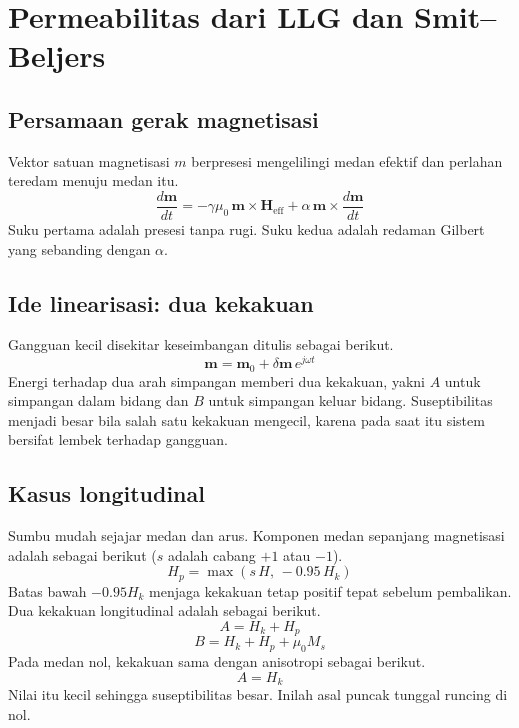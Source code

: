 \documentclass[a4paper,11pt]{article}
\begin{document}
\section{Permeabilitas dari LLG dan Smit--Beljers}
\subsection{Persamaan gerak magnetisasi}
Vektor satuan magnetisasi $m$ berpresesi mengelilingi medan efektif
dan perlahan teredam menuju medan itu.
\begin{equation}
\frac{d\mathbf{m}}{dt}
= -\gamma\mu_{0}\,\mathbf{m}\times\mathbf{H}_{\mathrm{eff}}
+ \alpha\,\mathbf{m}\times\frac{d\mathbf{m}}{dt}
\label{eq:8}
\end{equation}
Suku pertama adalah presesi tanpa rugi.
Suku kedua adalah redaman Gilbert yang sebanding dengan $\alpha$.

\subsection{Ide linearisasi: dua kekakuan}
Gangguan kecil disekitar keseimbangan ditulis sebagai berikut.
\begin{equation*}
\mathbf{m} = \mathbf{m}_{0}+\delta\mathbf{m}\,e^{j\omega t}
\end{equation*}
Energi terhadap dua arah simpangan memberi dua kekakuan, yakni $A$ untuk
simpangan dalam bidang dan $B$ untuk simpangan keluar bidang.
Suseptibilitas menjadi besar bila salah satu kekakuan mengecil, karena pada
saat itu sistem bersifat lembek terhadap gangguan.

\subsection{Kasus longitudinal}
Sumbu mudah sejajar medan dan arus.
Komponen medan sepanjang magnetisasi adalah sebagai berikut
($s$ adalah cabang $+1$ atau $-1$).
\begin{equation*}
H_{p} = \max(s\,H,\,-0.95\,H_{k})
\end{equation*}
Batas bawah $-0.95H_{k}$ menjaga kekakuan tetap positif
tepat sebelum pembalikan.
Dua kekakuan longitudinal adalah sebagai berikut.
\begin{equation*}
A = H_{k}+H_{p}
\end{equation*}
\begin{equation*}
B = H_{k}+H_{p}+\mu_{0}M_{s}
\end{equation*}
Pada medan nol, kekakuan sama dengan anisotropi sebagai berikut.
\begin{equation*}
A = H_{k}
\end{equation*}
Nilai itu kecil sehingga suseptibilitas besar.
Inilah asal puncak tunggal runcing di nol.
\end{document}
